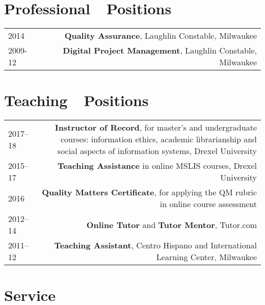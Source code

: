 \documentclass[letterpaper,11pt]{article}
\begin{document}
\section*{Professional~~Positions}
\begin{longtable}{ @{} L @{} R @{} }
2014&		\textbf{Quality Assurance}, Laughlin Constable, Milwaukee\\
2009-12&		\textbf{Digital Project Management}, Laughlin Constable, Milwaukee
\end{longtable}

\section*{Teaching~~Positions}
\begin{longtable}{ @{} L @{} R @{} }
2017--18&	\textbf{Instructor of Record}, for master’s and undergraduate courses: information ethics, academic librarianship and social aspects of information systems, Drexel University\\
2015--17&		\textbf{Teaching Assistance} in online MSLIS courses, Drexel University\\
2016&		\textbf{Quality Matters Certificate}, for applying the QM rubric in online course assessment\\
2012--14&	\textbf{Online Tutor} and \textbf{Tutor Mentor}, Tutor.com\\
2011--12	&	\textbf{Teaching Assistant}, Centro Hispano and International Learning Center, Milwaukee	\\
\end{longtable}


\section*{Service}
\end{document}
